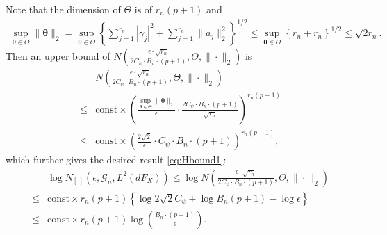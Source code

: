 \documentclass[11pt]{article}
\numberwithin{equation}{section}
\begin{document}
Note that the dimension of $\Theta$ is of $r_n(p+1)$ and
\begin{align*}
	\sup_{\boldsymbol{\theta}\in\Theta}\|\boldsymbol{\theta}\|_2=\sup_{\boldsymbol{\theta}\in\Theta}\left\{ \sum_{j=1}^{r_n}|\gamma_j|^2 +\sum_{j=1}^{r_n}\|a_j\|_2^2 \right\}^{1/2}
	\leq \sup_{\boldsymbol{\theta}\in\Theta}\left\{ r_n  +r_n \right\}^{1/2}\leq \sqrt{2r_n}.
\end{align*}
Then an upper bound of $N\left(\frac{\epsilon\cdot \sqrt{r_n}}{2C_{\psi}\cdot B_n\cdot (p+1)},\Theta,\|\cdot\|_2\right)$ is
\begin{align*}
	&N\left(\frac{\epsilon\cdot \sqrt{r_n}}{2C_{\psi}\cdot B_n\cdot (p+1)},\Theta,\|\cdot\|_2\right)\\
	\leq & \text{const}\times \left(\frac{\sup_{\boldsymbol{\theta}\in\Theta}\|\boldsymbol{\theta}\|_2}{\epsilon}\cdot \frac{2C_{\psi}\cdot B_n\cdot  (p+1)}{\sqrt{r_n}}\right)^{r_n(p+1)} \\
	\leq & \text{const}\times \left(\frac{2\sqrt{2}}{\epsilon}\cdot C_{\psi}\cdot B_n\cdot  (p+1)\right)^{r_n(p+1)},
\end{align*}
which further gives the desired result \eqref{eq:Hbound1}:
\begin{align*}
	&\log N_{[\ ]}\left(\epsilon,\mathcal{G}_{n},L^2(dF_X)\right)
	\leq  \log N\left(\frac{\epsilon\cdot \sqrt{r_n}}{2C_{\psi}\cdot B_n\cdot (p+1)},\Theta,\|\cdot\|_2\right)\\
	\leq & \text{const}\times r_n(p+1)\left\{\log 2\sqrt{2}C_{\psi}+ \log B_n(p+1)-\log \epsilon \right\}\\
	\leq &  \text{const}\times r_n(p+1)\log \left(\frac{B_n\cdot(p+1)}{\epsilon}\right).
\end{align*}
\end{document}
